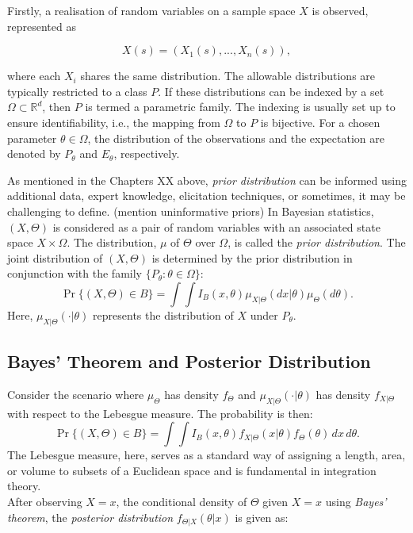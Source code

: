 \documentclass[
  11pt,
]{article}
\begin{document}
Firstly, a realisation of random variables on a sample space \(X\) is
observed, represented as

\begin{equation}
X(s) = (X_1(s), ..., X_n(s)),
\end{equation}

where each \(X_i\) shares the same distribution. The allowable
distributions are typically restricted to a class \(P\). If these
distributions can be indexed by a set \(\Omega \subset \mathbb{R}^d\),
then \(P\) is termed a parametric family. The indexing is usually set up
to ensure identifiability, i.e., the mapping from \(\Omega\) to \(P\) is
bijective. For a chosen parameter \(\theta \in \Omega\), the
distribution of the observations and the expectation are denoted by
\(P_\theta\) and \(E_\theta\), respectively.

As mentioned in the Chapters XX above, \emph{prior distribution} can be
informed using additional data, expert knowledge, elicitation
techniques, or sometimes, it may be challenging to define. (mention
uninformative priors) In Bayesian statistics, \((X, \Theta)\) is
considered as a pair of random variables with an associated state space
\(X \times \Omega\). The distribution, \(\mu\) of \(\Theta\) over
\(\Omega\), is called the \emph{prior distribution}. The joint
distribution of \((X, \Theta)\) is determined by the prior distribution
in conjunction with the family \(\{P_\theta : \theta \in \Omega\}\):
\begin{equation}
\Pr\{(X,\Theta) \in B\} = \int \int I_B(x,\theta) \mu_{X|\Theta}(dx|\theta) \mu_{\Theta}(d\theta).
\end{equation} Here, \(\mu_{X|\Theta}(\cdot|\theta)\) represents the
distribution of \(X\) under \(P_{\theta}\).

\subsection{Bayes’ Theorem and Posterior Distribution}

Consider the scenario where \(\mu_{\Theta}\) has density \(f_{\Theta}\)
and \(\mu_{X|\Theta}(\cdot|\theta)\) has density \(f_{X|\Theta}\) with
respect to the Lebesgue measure. The probability is then:
\begin{equation}
\Pr\{(X,\Theta) \in B\} = \int\int I_B(x,\theta)f_{X|\Theta}(x|\theta)f_{\Theta}(\theta) \,dx \,d\theta.
\end{equation} The Lebesgue measure, here, serves as a standard way of
assigning a length, area, or volume to subsets of a Euclidean space and
is fundamental in integration theory.\\
After observing \(X = x\), the conditional density of \(\Theta\) given
\(X = x\) using \emph{Bayes' theorem}, the \emph{posterior distribution}
\(f_{\Theta|X}(\theta|x)\) is given as:
\end{document}
